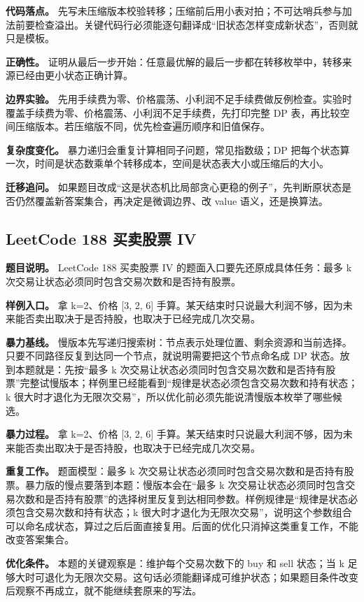 \textbf{代码落点。} 先写未压缩版本校验转移；压缩前后用小表对拍；不可达哨兵参与加法前要检查溢出。关键代码行必须能逐句翻译成“旧状态怎样变成新状态”，否则就只是模板。

\textbf{正确性。} 证明从最后一步开始：任意最优解的最后一步都在转移枚举中，转移来源已经由更小状态正确计算。

\textbf{边界实验。} 先用手续费为零、价格震荡、小利润不足手续费做反例检查。实验时覆盖手续费为零、价格震荡、小利润不足手续费，先打印完整 DP 表，再比较空间压缩版本。若压缩版不同，优先检查遍历顺序和旧值保存。

\textbf{复杂度变化。} 暴力递归会重复计算相同子问题，常见指数级；DP 把每个状态算一次，时间是状态数乘单个转移成本，空间是状态表大小或压缩后的大小。

\textbf{迁移追问。} 如果题目改成“这是状态机比局部贪心更稳的例子”，先判断原状态是否仍然覆盖新答案集合，再决定是微调边界、改 value 语义，还是换算法。

\subsection{LeetCode 188 买卖股票 IV}

\textbf{题目说明。} LeetCode 188 买卖股票 IV 的题面入口要先还原成具体任务：最多 k 次交易让状态必须同时包含交易次数和是否持有股票。

\textbf{样例入口。} 拿 k=2、价格 [3, 2, 6] 手算。某天结束时只说最大利润不够，因为未来能否卖出取决于是否持股，也取决于已经完成几次交易。

\textbf{暴力基线。} 慢版本先写递归搜索树：节点表示处理位置、剩余资源和当前选择。只要不同路径反复到达同一个节点，就说明需要把这个节点命名成 DP 状态。放到本题就是：先按“最多 k 次交易让状态必须同时包含交易次数和是否持有股票”完整试慢版本；样例里已经能看到“规律是状态必须包含交易次数和持有状态；k 很大时才退化为无限次交易”，所以优化前必须先能说清慢版本枚举了哪些候选。

\textbf{暴力过程。} 拿 k=2、价格 [3, 2, 6] 手算。某天结束时只说最大利润不够，因为未来能否卖出取决于是否持股，也取决于已经完成几次交易。

\textbf{重复工作。} 题面模型：最多 k 次交易让状态必须同时包含交易次数和是否持有股票。暴力版的慢点要落到本题：慢版本会在“最多 k 次交易让状态必须同时包含交易次数和是否持有股票”的选择树里反复到达相同参数。样例规律是“规律是状态必须包含交易次数和持有状态；k 很大时才退化为无限次交易”，说明这个参数组合可以命名成状态，算过之后后面直接复用。后面的优化只消掉这类重复工作，不能改变答案集合。

\textbf{优化条件。} 本题的关键观察是：维护每个交易次数下的 buy 和 sell 状态；当 k 足够大时可退化为无限次交易。这句话必须能翻译成可维护状态；如果题目条件改变后观察不再成立，就不能继续套原来的写法。

